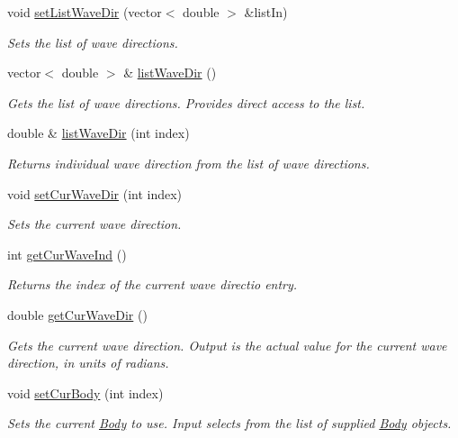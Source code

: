 \begin{DoxyCompactItemize}
void \hyperlink{class_outputs_body_aea1ad7f17db0392354f1617c59b8d1fc}{set\-List\-Wave\-Dir} (vector$<$ double $>$ \&list\-In)
\begin{DoxyCompactList}\small\item\em Sets the list of wave directions. \end{DoxyCompactList}\item 
vector$<$ double $>$ \& \hyperlink{class_outputs_body_a710a66d19fb8ba5a6c9c15e0143f832e}{list\-Wave\-Dir} ()
\begin{DoxyCompactList}\small\item\em Gets the list of wave directions. Provides direct access to the list. \end{DoxyCompactList}\item 
double \& \hyperlink{class_outputs_body_abc0b04ccd535145e9c9528cde8cd4d15}{list\-Wave\-Dir} (int index)
\begin{DoxyCompactList}\small\item\em Returns individual wave direction from the list of wave directions. \end{DoxyCompactList}\item 
void \hyperlink{class_outputs_body_a7d2b93ecaf1fa39257444bdf3194eacc}{set\-Cur\-Wave\-Dir} (int index)
\begin{DoxyCompactList}\small\item\em Sets the current wave direction. \end{DoxyCompactList}\item 
int \hyperlink{class_outputs_body_acac6b220f8d472d3cc7e9102022c88ff}{get\-Cur\-Wave\-Ind} ()
\begin{DoxyCompactList}\small\item\em Returns the index of the current wave directio entry. \end{DoxyCompactList}\item 
double \hyperlink{class_outputs_body_a21deeef0aaace27fa376c6222bc8b0a4}{get\-Cur\-Wave\-Dir} ()
\begin{DoxyCompactList}\small\item\em Gets the current wave direction. Output is the actual value for the current wave direction, in units of radians. \end{DoxyCompactList}\item 
void \hyperlink{class_outputs_body_a4b33361c2888937d2aa450f3e6df200d}{set\-Cur\-Body} (int index)
\begin{DoxyCompactList}\small\item\em Sets the current \hyperlink{class_body}{Body} to use. Input selects from the list of supplied \hyperlink{class_body}{Body} objects. \end{DoxyCompactList}\item 

\end{DoxyCompactItemize}

